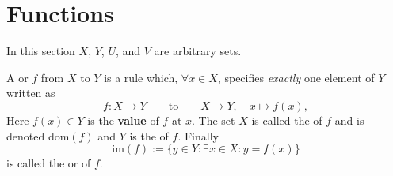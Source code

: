 \section{Functions}

\begin{center}
    In this section $X$, $Y$, $U$, and $V$ are arbitrary sets.
\end{center}

A  or  $f$ from $X$ to $Y$ is a rule which, $\forall x \in X$, specifies \emph{exactly} one element of $Y$ written as 
$$
f : X \to Y \qquad \text{to} \qquad X \to Y, \quad x \mapsto f(x),
$$
Here $f(x) \in Y$ is the \textbf{value} of $f$ at $x$. The set $X$ is called the  of $f$ and is denoted $\text{dom}(f)$ and $Y$ is the  of $f$. Finally 
$$
\text{im}(f) := \{y \in Y: \exists x \in X : y = f(x)\}
$$
is called the  or  of $f$.